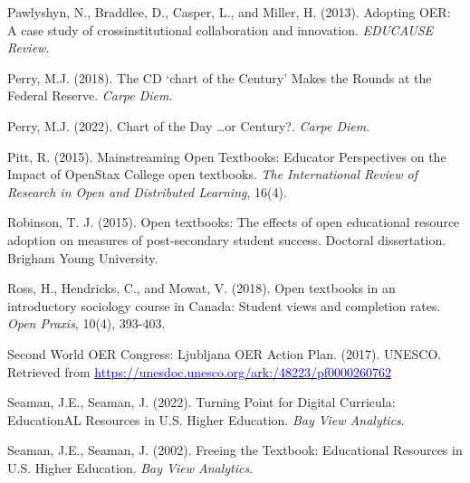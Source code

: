 \documentclass[11pt]{article}
\newcommand{\alink}[2]{\href{#1}{\textcolor{blue}{#2}}}
\begin{document}
\begin{thebibliography}{99}
   Pawlyshyn, N., Braddlee, D., Casper, L., and Miller, H. (2013). Adopting OER: A case study of crossinstitutional collaboration and innovation. {\em EDUCAUSE Review}.

   Perry, M.J. (2018). The CD `chart of the Century' Makes the Rounds at the Federal Reserve. {\em Carpe Diem}.%

   Perry, M.J. (2022). Chart of the Day \ldots or Century?. {\em Carpe Diem}.%

   Pitt, R. (2015). Mainstreaming Open Textbooks: Educator Perspectives on the Impact of OpenStax College open textbooks. {\em The International Review of Research in Open and Distributed Learning}, 16(4).

   Robinson, T. J. (2015). Open textbooks: The effects of open educational resource adoption on measures of post-secondary student success. Doctoral dissertation. Brigham Young University.

   Ross, H., Hendricks, C., and Mowat, V. (2018). Open textbooks in an introductory sociology course in Canada: Student views and completion rates. {\em Open Praxis}, 10(4), 393-403.

   Second World OER Congress: Ljubljana OER Action Plan. (2017). UNESCO. \newline Retrieved from \alink{https://unesdoc.unesco.org/ark:/48223/pf0000260762}{https://unesdoc.unesco.org/ark:/48223/pf0000260762}

   Seaman, J.E., Seaman, J. (2022). Turning Point for Digital Curricula: EducationAL Resources in U.S. Higher Education. {\em Bay View Analytics}.%

   Seaman, J.E., Seaman, J. (2002). Freeing the Textbook: Educational Resources in U.S. Higher Education. {\em Bay View Analytics}. %


\end{thebibliography}
\end{document}

